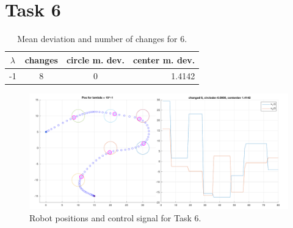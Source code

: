 \section{Task 6}

\begin{table}[!htb]
    \centering
    \caption{Mean deviation and number of changes for 6.}
    \begin{tabular}{c|ccr}
    $\lambda$ & changes & circle m. dev. & center m. dev. \\
    \hline
    -1 & 8 & 0 & 1.4142
    \end{tabular}
\end{table}

\begin{figure}[!htb]
    \caption{Robot positions and control signal for Task 6.}
    \label{fig:task6:graph}
    \centering    
    \includegraphics[width=1\linewidth]{part1/figures/task_6.pdf}
\end{figure}

